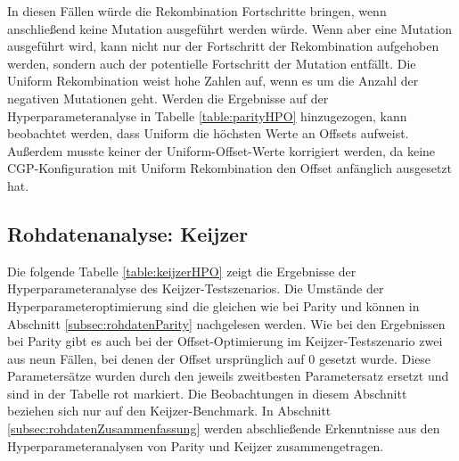 In diesen Fällen würde die Rekombination Fortschritte bringen, wenn anschließend keine Mutation ausgeführt werden würde.
Wenn aber eine Mutation ausgeführt wird, kann nicht nur der Fortschritt der Rekombination aufgehoben werden, sondern auch der potentielle Fortschritt der Mutation entfällt.
Die Uniform Rekombination weist hohe Zahlen auf, wenn es um die Anzahl der negativen Mutationen geht. 
Werden die Ergebnisse auf der Hyperparameteranalyse in Tabelle \ref{table:parityHPO} hinzugezogen, kann beobachtet werden, dass Uniform die höchsten Werte an Offsets aufweist.
Außerdem musste keiner der Uniform-Offset-Werte korrigiert werden, da keine CGP-Konfiguration mit Uniform Rekombination den Offset anfänglich ausgesetzt hat.

\subsection{Rohdatenanalyse: Keijzer}
\label{subsec:rohdatenKeijzer}

Die folgende Tabelle \ref{table:keijzerHPO} zeigt die Ergebnisse der Hyperparameteranalyse des Keijzer-Test\-sze\-narios.
Die Umstände der Hyperparameteroptimierung sind die gleichen wie bei Parity und können in Abschnitt \ref{subsec:rohdatenParity} nachgelesen werden.
Wie bei den Ergebnissen bei Parity gibt es auch bei der Offset-Optimierung im Keijzer-Testszenario zwei aus neun Fällen, bei denen der Offset ursprünglich auf 0 gesetzt wurde.
Diese Parametersätze wurden durch den jeweils zweitbesten Parametersatz ersetzt und sind in der Tabelle rot markiert.
Die Beobachtungen in diesem Abschnitt beziehen sich nur auf den Keijzer-Benchmark.
In Abschnitt \ref{subsec:rohdatenZusammenfassung} werden abschließende Erkenntnisse aus den Hyperparameteranalysen von Parity und Keijzer zusammengetragen.

